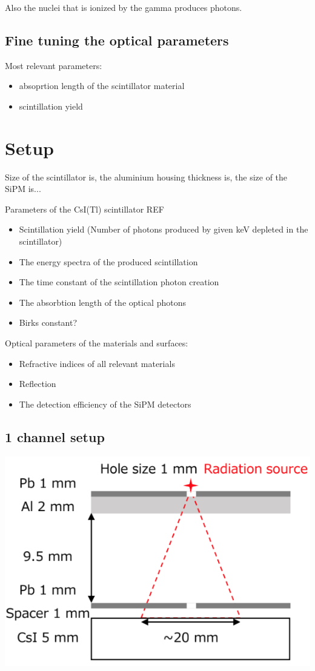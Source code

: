 \documentclass[12pt, a4paper,titlepage]{article}
\numberwithin{equation}{section}
\numberwithin{figure}{section}
\begin{document}
Also the nuclei that is ionized by the gamma produces photons.
 
\subsection{Fine tuning the optical parameters}

Most relevant parameters:
\begin{itemize}
\item absoprtion length of the scintillator material
\item scintillation yield
\end{itemize}

\section{Setup}

Size of the scintillator is, the aluminium housing thickness is, the size of the SiPM is...

Parameters of the CsI(Tl) scintillator REF

\begin{itemize}
\item Scintillation yield (Number of photons produced by given keV depleted in the scintillator)
\item The energy spectra of the produced scintillation
\item The time constant of the scintillation photon creation
\item The absorbtion length of the optical photons
\item Birks constant?
\end{itemize}

Optical parameters of the materials and surfaces:
\begin{itemize}
\item Refractive indices of all relevant materials
\item Reflection
\item The detection efficiency of the SiPM detectors
\end{itemize}

\subsection{1 channel setup}

\includegraphics[width=150.0mm]{images/irradiation.png}
\end{document}
